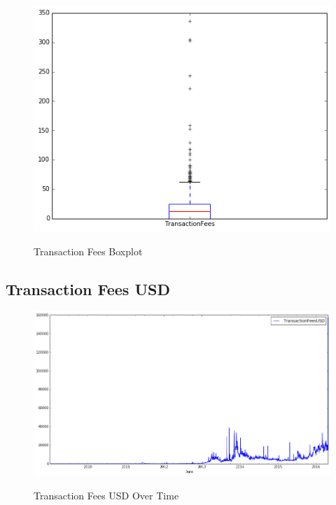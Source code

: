 \begin{figure}[bth]
  \myfloatalign
  {\includegraphics[width=1\linewidth]
    {gfx/transaction-fees-boxplot}}
  \caption{Transaction Fees
    Boxplot}
  \label{fig:transaction-fees-boxplot}
\end{figure}

\clearpage

\subsection{Transaction Fees USD}
\label{sec:transaction-fees-usd}

\begin{figure}[bth]
  \myfloatalign
  {\includegraphics[width=1\linewidth]
    {gfx/transaction-fees-usd-over-time}}
  \caption{Transaction Fees USD
    Over Time}
  \label{fig:transaction-fees-usd-over-time}
\end{figure}

